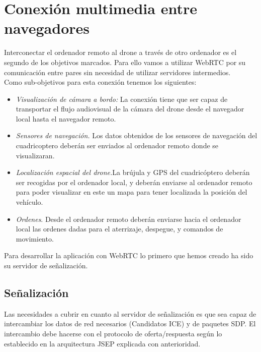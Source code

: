 \section{Conexión multimedia entre navegadores}

Interconectar el ordenador remoto al drone a través de otro ordenador es el segundo de los objetivos marcados. Para ello vamos a utilizar WebRTC por su comunicación entre pares sin necesidad de utilizar servidores intermedios.\\

Como sub-objetivos para esta conexión tenemos los siguientes:

\begin{itemize}

\item \emph{Visualización de cámara a bordo:} La conexión tiene que ser capaz de transportar el flujo audiovisual de la cámara del drone desde el navegador local hasta el navegador remoto.

\item \emph{Sensores de navegación.} Los datos obtenidos de los sensores de navegación del cuadricoptero deberán ser enviados al ordenador remoto donde se visualizaran.

\item \emph{Localización espacial del drone.}La brújula y GPS del cuadricóptero deberán ser recogidas por el ordenador local, y deberán enviarse al ordenador remoto para poder visualizar en este un mapa para tener localizada la posición del vehículo.

\item \emph{Ordenes}. Desde el ordenador remoto deberán enviarse hacia el ordenador local las ordenes dadas para el aterrizaje, despegue, y comandos de movimiento.

\end{itemize}

Para desarrollar la aplicación con WebRTC lo primero que hemos creado ha sido su servidor de señalización.\\

\subsection{Señalización}

Las necesidades a cubrir en cuanto al servidor de señalización es que sea capaz de intercambiar los datos de red necesarios (Candidatos ICE) y de paquetes SDP. El intercambio debe hacerse con el protocolo de oferta/respuesta según lo establecido en la arquitectura JSEP explicada con anterioridad.\\

